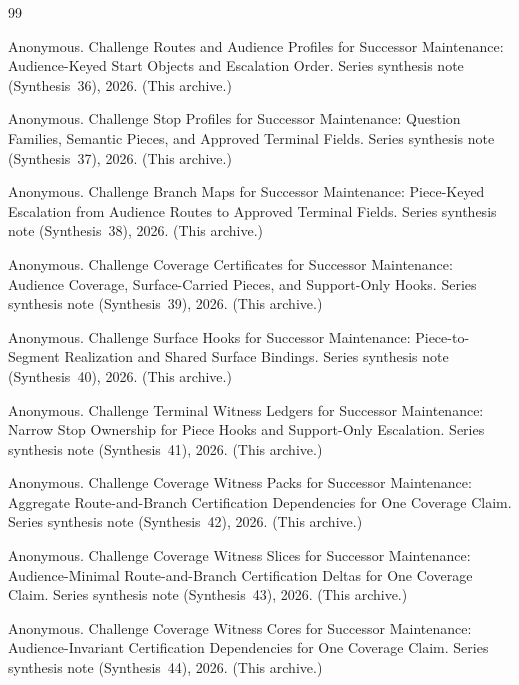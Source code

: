 \documentclass[11pt]{article}
\begin{document}
\begin{thebibliography}{99}\small

Anonymous.
\newblock Challenge Routes and Audience Profiles for Successor Maintenance: Audience-Keyed Start Objects and Escalation Order.
\newblock Series synthesis note (Synthesis~36), 2026. (This archive.)

Anonymous.
\newblock Challenge Stop Profiles for Successor Maintenance: Question Families, Semantic Pieces, and Approved Terminal Fields.
\newblock Series synthesis note (Synthesis~37), 2026. (This archive.)

Anonymous.
\newblock Challenge Branch Maps for Successor Maintenance: Piece-Keyed Escalation from Audience Routes to Approved Terminal Fields.
\newblock Series synthesis note (Synthesis~38), 2026. (This archive.)

Anonymous.
\newblock Challenge Coverage Certificates for Successor Maintenance: Audience Coverage, Surface-Carried Pieces, and Support-Only Hooks.
\newblock Series synthesis note (Synthesis~39), 2026. (This archive.)

Anonymous.
\newblock Challenge Surface Hooks for Successor Maintenance: Piece-to-Segment Realization and Shared Surface Bindings.
\newblock Series synthesis note (Synthesis~40), 2026. (This archive.)

Anonymous.
\newblock Challenge Terminal Witness Ledgers for Successor Maintenance: Narrow Stop Ownership for Piece Hooks and Support-Only Escalation.
\newblock Series synthesis note (Synthesis~41), 2026. (This archive.)

Anonymous.
\newblock Challenge Coverage Witness Packs for Successor Maintenance: Aggregate Route-and-Branch Certification Dependencies for One Coverage Claim.
\newblock Series synthesis note (Synthesis~42), 2026. (This archive.)

Anonymous.
\newblock Challenge Coverage Witness Slices for Successor Maintenance: Audience-Minimal Route-and-Branch Certification Deltas for One Coverage Claim.
\newblock Series synthesis note (Synthesis~43), 2026. (This archive.)

Anonymous.
\newblock Challenge Coverage Witness Cores for Successor Maintenance: Audience-Invariant Certification Dependencies for One Coverage Claim.
\newblock Series synthesis note (Synthesis~44), 2026. (This archive.)


\end{thebibliography}
\end{document}

